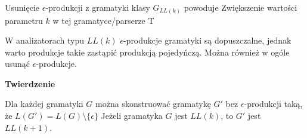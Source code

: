 \answer
{Usunięcie $\epsilon$-produkcji z gramatyki klasy $G_{LL(k)}$ powoduje}
{Zwiększenie wartości parametru $k$ w tej gramatyce/parserze}
{T}
{W analizatorach typu $LL(k)$ $\epsilon$-produkcje gramatyki są dopuszczalne, jednak warto produkcje takie zastąpić produkcją pojedyńczą. Można również w ogóle usunąć $\epsilon$-produkcje.

}
{\textbf{Twierdzenie}

Dla każdej gramatyki $G$ można skonstruować gramatykę $G'$ bez $\epsilon$-produkcji taką, że $L(G') = L(G)\setminus \{ \epsilon \}$
Jeżeli gramatyka $G$ jest $LL(k)$, to $G'$ jest $LL(k+1)$. }

